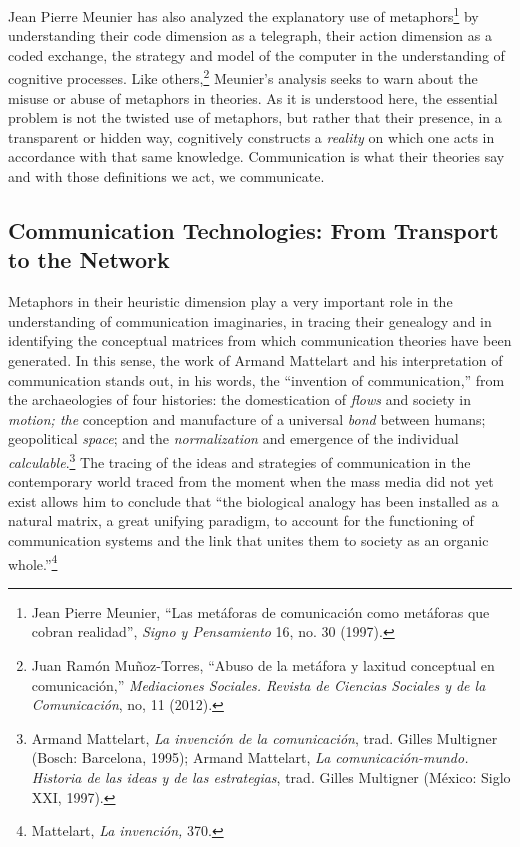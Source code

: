 \documentclass{tufte-handout}
\begin{document}
Jean Pierre Meunier has also analyzed the explanatory use of
metaphors\footnote{Jean Pierre Meunier, ``Las metáforas de comunicación
  como metáforas que cobran realidad'', \emph{Signo y Pensamiento} 16,
  no. 30 (1997).} by understanding their code dimension as a telegraph,
their action dimension as a coded exchange, the strategy and model of
the computer in the understanding of cognitive processes. Like
others,\footnote{Juan Ramón Muñoz-Torres, ``Abuso de la metáfora y
  laxitud conceptual en comunicación,'' \emph{Mediaciones Sociales.
  Revista de Ciencias Sociales y de la Comunicación}, no, 11 (2012).}
Meunier's analysis seeks to warn about the misuse or abuse of metaphors
in theories. As it is understood here, the essential problem is not the
twisted use of metaphors, but rather that their presence, in a
transparent or hidden way, cognitively constructs a \emph{reality} on
which one acts in accordance with that same knowledge. Communication is
what their theories say and with those definitions we act, we
communicate.

\hypertarget{communication-technologies-from-transport-to-the-network}{%
\subsection{Communication Technologies: From
Transport to the
Network}\label{communication-technologies-from-transport-to-the-network}}

Metaphors in their heuristic dimension play a very important role in the
understanding of communication imaginaries, in tracing their genealogy
and in identifying the conceptual matrices from which communication
theories have been generated. In this sense, the work of Armand
Mattelart and his interpretation of communication stands out, in his
words, the ``invention of communication,'' from the archaeologies of
four histories: the domestication of \emph{flows} and society in
\emph{motion; the} conception and manufacture of a universal \emph{bond}
between humans; geopolitical \emph{space}; and the \emph{normalization}
and emergence of the individual \emph{calculable}.\footnote{Armand
  Mattelart, \emph{La invención de la comunicación}, trad. Gilles
  Multigner (Bosch: Barcelona, 1995); Armand Mattelart, \emph{La
  comunicación-mundo. Historia de las ideas y de las estrategias}, trad.
  Gilles Multigner (México: Siglo XXI, 1997).} The tracing of the ideas
and strategies of communication in the contemporary world traced from
the moment when the mass media did not yet exist allows him to conclude
that ``the biological analogy has been installed as a natural matrix, a
great unifying paradigm, to account for the functioning of communication
systems and the link that unites them to society as an organic
whole.''\footnote{Mattelart, \emph{La invención,} 370.}
\end{document}
